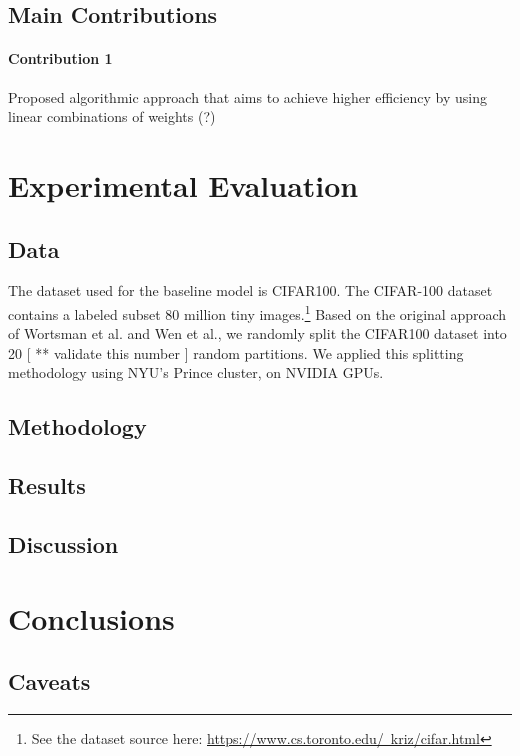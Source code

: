 \documentclass{article}
\begin{document}
\subsection{Main Contributions}

\paragraph{Contribution 1}
Proposed algorithmic approach that aims to achieve higher efficiency by using linear combinations of weights (?)


\section{Experimental Evaluation}

\subsection{Data}
The dataset used for the baseline model is CIFAR100. The CIFAR-100 dataset contains a labeled subset 80 million tiny images.\footnote{See the dataset source here: \href{https://www.cs.toronto.edu/~kriz/cifar.html}{https://www.cs.toronto.edu/~kriz/cifar.html}}
 Based on the original approach of Wortsman et al. and Wen et al., we randomly split the CIFAR100 dataset into 20 [ ** validate this number ] random partitions. We applied this splitting methodology using NYU's Prince cluster, on NVIDIA GPUs. 

\subsection{Methodology}

\subsection{Results}

\subsection{Discussion}

\section{Conclusions}

\subsection{Caveats}
\end{document}
